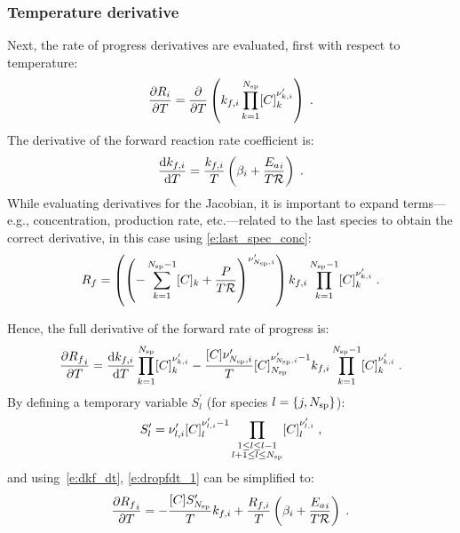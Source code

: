 \documentclass[12pt,number,sort&compress]{elsarticle}
\begin{document}
\subsubsection{Temperature derivative}
\label{s:dri_dt}
Next, the rate of progress derivatives are evaluated, first with respect to temperature:
\begin{equation}
 \frac{\partial R_{i}}{\partial T } = \frac{\partial}{\partial T}\left({k_{f, i}} \prod_{k=1}^{\ns/} [C]_{k}^{\nu^{\prime}_{k,i}}\right)\;.
\end{equation}
The derivative of the forward reaction rate coefficient is:
\begin{equation}
 \label{e:dkf_dt}
 \frac{\text{d} k_{f, i} }{\text{d} T } = \frac{{k_{f, i}}}{T} \left(\beta_{i} + \frac{{E_{a}}_{i}}{T \Ru/}\right)\;.
\end{equation}
While evaluating derivatives for the Jacobian, it is important to expand terms---e.g., concentration, production rate, etc.---related to the last species to obtain the correct derivative, in this case using \cref{e:last_spec_conc}:
\begin{equation}
 {R_f} = \left(\left(- \sum_{k=1}^{\ns/  - 1} [C]_{k} + \frac{P}{T \Ru/}\right)^{\nu^{\prime}_{\ns/,i}}\right) {k_{f, i}} \prod_{k=1}^{\ns/  - 1} [C]_{k}^{\nu^{\prime}_{k,i}}\;.
\end{equation}

Hence, the full derivative of the forward rate of progress is:
\begin{equation}
 \label{e:dropfdt_1}
 \frac{\partial {R_f} _{i}}{\partial T } = \frac{\text{d} k_{f, i} }{\text{d} T } \prod_{k=1}^{\ns/} [C]_{k}^{\nu^{\prime}_{k,i}} - \frac{[C] \nu^{\prime}_{\ns/,i}}{T} [C]_{\ns/}^{\nu^{\prime}_{\ns/,i} - 1} {k_{f, i}} \prod_{k=1}^{\ns/  - 1} [C]_{k}^{\nu^{\prime}_{k,i}}\;.
\end{equation}
By defining a temporary variable $S^{\prime}_{l}$ (for species $l = \left\{j, \ns/\right\}$):
\begin{equation}
 \label{e:s_temp}
 S^{\prime}_{l} = \nu^{\prime}_{l,i} [C]_{l}^{\nu^{\prime}_{l,i} - 1} \prod_{\substack{1 \leq l \leq l - 1\\l + 1 \leq l \leq \ns/}} [C]_{l}^{\nu^{\prime}_{l,i}}\;,
\end{equation}
and using~\cref{e:dkf_dt}, \cref{e:dropfdt_1} can be simplified to:
\begin{equation}
 \label{e:dropf_dt}
 \frac{\partial {R_f}_{i}}{\partial T } = - \frac{[C] S^{\prime}_{\ns/}}{T} {k_{f, i}} + \frac{{R_{f, i}}}{T} \left(\beta_{i} + \frac{{E_{a}}_{i}}{T \Ru/}\right)\;.
\end{equation}
\end{document}
